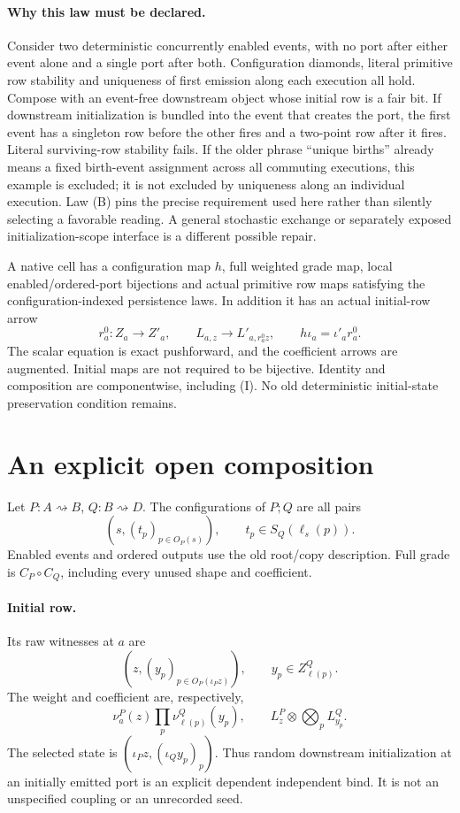 \documentclass[11pt]{article}
\begin{document}
\paragraph{Why this law must be declared.}
Consider two deterministic concurrently enabled events, with no port after either event alone and a single port after both. Configuration diamonds, literal primitive row stability and uniqueness of first emission along each execution all hold. Compose with an event-free downstream object whose initial row is a fair bit. If downstream initialization is bundled into the event that creates the port, the first event has a singleton row before the other fires and a two-point row after it fires. Literal surviving-row stability fails. If the older phrase ``unique births'' already means a fixed birth-event assignment across all commuting executions, this example is excluded; it is not excluded by uniqueness along an individual execution. Law (B) pins the precise requirement used here rather than silently selecting a favorable reading. A general stochastic exchange or separately exposed initialization-scope interface is a different possible repair.

A native cell has a configuration map $h$, full weighted grade map, local enabled/ordered-port bijections and actual primitive row maps satisfying the configuration-indexed persistence laws. In addition it has an actual initial-row arrow
\[
 r^0_a:Z_a\to Z'_a,\qquad L_{a,z}\to L'_{a,r^0_a z},
 \qquad h\iota_a=\iota'_a r^0_a.                         \tag{I}
\]
The scalar equation is exact pushforward, and the coefficient arrows are augmented. Initial maps are not required to be bijective. Identity and composition are componentwise, including (I). No old deterministic initial-state preservation condition remains.

\section{An explicit open composition}
Let $P:A\rightsquigarrow B$, $Q:B\rightsquigarrow D$. The configurations of $P;Q$ are all pairs
\[
 (s,(t_p)_{p\in O_P(s)}),\qquad t_p\in S_Q(\ell_s(p)).
\]
Enabled events and ordered outputs use the old root/copy description. Full grade is $C_P\circ C_Q$, including every unused shape and coefficient.

\paragraph{Initial row.}
Its raw witnesses at $a$ are
\[
 \left(z,(y_p)_{p\in O_P(\iota_Pz)}\right),
 \qquad y_p\in Z^Q_{\ell(p)}.
\]
The weight and coefficient are, respectively,
\[
 \nu^P_a(z)\prod_p\nu^Q_{\ell(p)}(y_p),\qquad
 L^P_z\otimes\bigotimes_p L^Q_{y_p}.                     \tag{J}
\]
The selected state is $(\iota_Pz,(\iota_Qy_p)_p)$. Thus random downstream initialization at an initially emitted port is an explicit dependent independent bind. It is not an unspecified coupling or an unrecorded seed.
\end{document}

